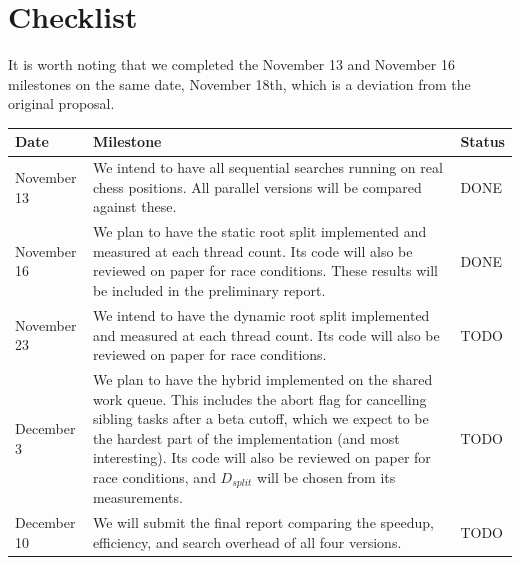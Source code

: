\documentclass[10pt, conference, compsocconf]{IEEEtran}
\begin{document}
\section{Checklist}\label{sec:checklist}

It is worth noting that we completed the November 13 and November 16 milestones on the same date, November 18th, which is a deviation from the original proposal.

\begin{table}[H]
\label{tab:checklist}
\centering
\footnotesize
\renewcommand{\arraystretch}{1.0}
\setlength{\tabcolsep}{3pt}
\begin{tabular}{|>{\centering\arraybackslash}m{0.62in}|m{1.85in}|>{\centering\arraybackslash}m{0.38in}|}
\hline
\textbf{Date} & \centering\arraybackslash\textbf{Milestone} & \textbf{Status} \\
\hline
November 13 & We intend to have all sequential searches running on real chess positions. All parallel versions will be compared against these. & DONE \\
\hline
November 16 & We plan to have the static root split implemented and measured at each thread count. Its code will also be reviewed on paper for race conditions. These results will be included in the preliminary report. & DONE \\
\hline
November 23 & We intend to have the dynamic root split implemented and measured at each thread count. Its code will also be reviewed on paper for race conditions. & TODO \\
\hline
December 3 & We plan to have the hybrid implemented on the shared work queue. This includes the abort flag for cancelling sibling tasks after a beta cutoff, which we expect to be the hardest part of the implementation (and most interesting). Its code will also be reviewed on paper for race conditions, and $D_{split}$ will be chosen from its measurements. & TODO \\
\hline
December 10 & We will submit the final report comparing the speedup, efficiency, and search overhead of all four versions. & TODO \\
\hline
\end{tabular}
\end{table}



\end{document}
